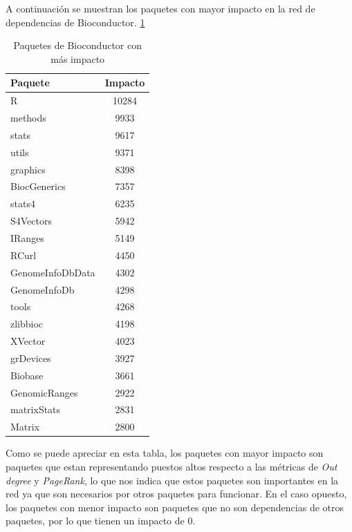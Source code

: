 A continuación se muestran los paquetes con mayor impacto en la red de dependencias de Bioconductor. \ref{tab:bioconductor_top_impact}

\begin{table}[ht!]
    \centering
    \small
    \label{tab:bioconductor_top_impact}
    \begin{tabular}{|l|c|}
        \hline
        \textbf{Paquete} & \textbf{Impacto} \\
        \hline
        R                & 10284            \\
        methods          & 9933             \\
        stats            & 9617             \\
        utils            & 9371             \\
        graphics         & 8398             \\
        BiocGenerics     & 7357             \\
        stats4           & 6235             \\
        S4Vectors        & 5942             \\
        IRanges          & 5149             \\
        RCurl            & 4450             \\
        GenomeInfoDbData & 4302             \\
        GenomeInfoDb     & 4298             \\
        tools            & 4268             \\
        zlibbioc         & 4198             \\
        XVector          & 4023             \\
        grDevices        & 3927             \\
        Biobase          & 3661             \\
        GenomicRanges    & 2922             \\
        matrixStats      & 2831             \\
        Matrix           & 2800             \\
        \bottomrule
    \end{tabular}
    \caption{Paquetes de Bioconductor con más impacto}
\end{table}


Como se puede apreciar en esta tabla, los paquetes con mayor impacto son paquetes que estan representando puestos altos
respecto a las métricas de \textit{Out degree} y \textit{PageRank}, lo que nos indica que estos paquetes son importantes en la red ya que son
necesarios por otros paquetes para funcionar.
En el caso opuesto, los paquetes con menor impacto son paquetes que no son dependencias de otros paquetes, por lo que tienen
un impacto de 0.


